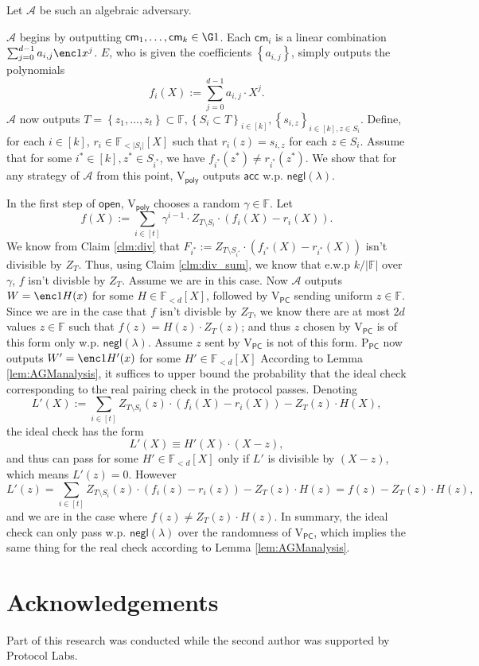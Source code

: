 \documentclass[11pt]{article} %
\newcommand{\F}{\ensuremath{\mathbb F}\xspace}
\newcommand{\adv}{\ensuremath{\mathcal A}\xspace}
\newcommand{\cm}{\ensuremath{\mathsf{cm}}\xspace}
\newcommand{\open}{\ensuremath{\mathsf{open}}\xspace}
\newcommand{\negl}{\ensuremath{\mathsf{negl}(\lambda)}\xspace}
\newcommand{\acc}{\ensuremath{\mathsf{acc}}\xspace}
\newcommand{\defeq}{:=}
\newcommand{\sett}[2]{\ensuremath{\set{#1}_{#2}}\xspace}
\newcommand{\prvpc}{\ensuremath{\mathrm{P_{\mathsf{PC}}}}\xspace}
\newcommand{\verpoly}{\ensuremath{\mathrm{V_{\mathsf{poly}}}}\xspace}
\newcommand{\verpc}{\ensuremath{\mathrm{V_{\mathsf{PC}}}}\xspace}
\newcommand{\ext}{\ensuremath{E}\xspace}
\newcommand{\set}[1]{\ensuremath{\left\{#1\right\}}\xspace}
\newcommand{\polysofdeg}[1]{\ensuremath{\F_{< #1}[X]}\xspace}
\begin{document}
\begin{enumerate}
 
 Let \adv be such an algebraic adversary.
 
 \adv begins by outputting $\cm_1,\ldots,\cm_k\in \G1$.
 Each $\cm_i$ is a linear combination $\sum_{j=0}^{d-1} a_{i,j} \enc1{x^j}$.
 \ext, who is given the coefficients \set{a_{i,j}}, simply outputs the polynomials
 \[f_i(X)\defeq \sum_{j=0}^{d-1} a_{i,j} \cdot X^j.\]
 \adv now outputs $T=\set{z_1,\ldots,z_t}\subset \F,\sett{S_i\subset T}{i\in [k]},\sett{s_{i,z}}{i\in [k],z\in S_i}$.
 Define, for each $i\in [k]$, $r_i\in \polysofdeg{|S_i|}$ such that $r_i(z)= s_{i,z}$ for each $z\in S_i$.
  Assume that for some $i^*\in [k],z^*\in S_{i^*}$, we have $f_{i^*}(z^*)\neq r_{i^*}(z^*)$. We show that for any strategy of \adv from this point, \verpoly outputs \acc w.p. \negl.
 
 In the first step of \open, \verpoly chooses a random $\gamma \in \F$.
 Let
 \[f(X)\defeq \sum_{i\in [t]} \gamma^{i-1} \cdot Z_{T\setminus S_i}\cdot (f_i(X)-r_i(X)).\]
 We know from Claim \ref{clm:div} that $F_{i^*} \defeq  Z_{T\setminus S_{i^*}}\cdot (f_{i^*}(X)-r_{i^*}(X))$ isn't divisible by $Z_T$. Thus, using Claim \ref{clm:div_sum}, we know that e.w.p $k/|\F|$ over $\gamma$, $f$ isn't divisble by $Z_T$. Assume we are in this case.  Now \adv outputs $W=\enc1{H(x)}$ for some $H\in\polysofdeg{d}$, followed
 by \verpc sending uniform $z\in \F$.
 Since we are in the case that $f$ isn't divisble by $Z_T$, we know there are at most
 $2d$ values $z\in \F$ such that $f(z) = H(z)\cdot Z_T(z)$; and thus $z$ chosen by \verpc is of this form only w.p. \negl. Assume $z$ sent by \verpc is not of this form.
  \prvpc now outputs $W'=\enc1{H'(x)}$ for some $H'\in \polysofdeg{d}$
 According to Lemma \ref{lem:AGManalysis}, it suffices to upper bound the probability that the ideal check corresponding to the real pairing check in the protocol passes. 
 Denoting
 \[L'(X)\defeq \sum_{i\in [t]} Z_{T\setminus S_i}(z)\cdot (f_i(X) - r_i(X)) - Z_T(z)\cdot H(X),\]
 the ideal check has the form
 \[L'(X)\equiv H'(X)\cdot (X-z),\]
 and thus can pass for some $H'\in \polysofdeg{d}$ only if $L'$ is divisible by $(X-z)$, which means $L'(z)=0$.
 However
 \[L'(z) = \sum_{i\in [t]} Z_{T\setminus S_i}(z)\cdot (f_i(z) - r_i(z)) - Z_T(z)\cdot H(z)=
  f(z)-Z_T(z)\cdot H(z),
 \]
and we are in the case where $f(z)\neq Z_T(z)\cdot H(z)$.
 In summary, the ideal check can only pass w.p. $\negl$ over the randomness of \verpc, which implies the same thing for the real check according to Lemma \ref{lem:AGManalysis}.
 
 
 \end{enumerate}

 


\section*{Acknowledgements}
Part of this research was conducted while the second author was supported by Protocol Labs.


    
\end{document}
